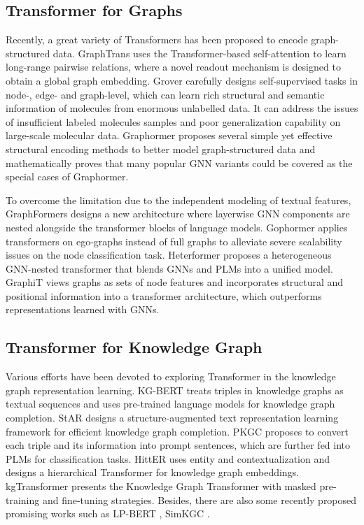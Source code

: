 \documentclass[sigconf]{acmart}
\begin{document}
\subsection{Transformer for Graphs}
Recently, a great variety of Transformers has been proposed to encode graph-structured data.
GraphTrans \cite{GraphTrans} uses the Transformer-based self-attention to learn long-range pairwise relations, where a novel readout mechanism is designed to obtain a global graph embedding.
Grover \cite{Grover} carefully designs self-supervised tasks in node-, edge- and graph-level, which can learn rich structural and semantic information of molecules from enormous unlabelled data.
It can address the issues of insufficient labeled molecules samples and poor generalization capability on large-scale molecular data.
Graphormer \cite{Graphormer} proposes several simple yet effective structural encoding methods to better model graph-structured data and mathematically proves that many popular GNN variants could be covered as the special cases of Graphormer. 

To overcome the limitation due to the independent modeling of textual features, GraphFormers \cite{GraphFormers} designs a new architecture where layerwise GNN components are nested alongside the transformer blocks of language models.
Gophormer \cite{Gophormer} applies transformers on ego-graphs instead of full graphs to alleviate severe scalability issues on the node classification task.
Heterformer \cite{Heterformer} proposes a heterogeneous GNN-nested transformer that blends GNNs and PLMs into a unified model.
GraphiT \cite{GraphiT} views graphs as sets of node features and incorporates structural and positional information into a transformer architecture, which outperforms representations learned with GNNs.


\subsection{Transformer for Knowledge Graph}
Various efforts have been devoted to exploring Transformer in the knowledge graph representation learning. 
KG-BERT \cite{KG-BERT} treats triples in knowledge graphs as textual sequences and uses pre-trained language models for knowledge graph completion.
StAR \cite{StAR} designs a structure-augmented text representation learning framework for efficient knowledge graph completion.
PKGC \cite{PKGC} proposes to convert each triple and its information into prompt sentences, which are further fed into PLMs for classification tasks.
HittER \cite{HittER} uses entity and contextualization and designs a hierarchical Transformer for knowledge graph embeddings.
kgTransformer \cite{kgTransformer} presents the Knowledge Graph Transformer with masked pre-training and fine-tuning strategies.
Besides, there are also some recently proposed promising works such as LP-BERT \cite{LP-BERT}, SimKGC \cite{DBLP:conf/acl/0046ZWL22}.
\end{document}
